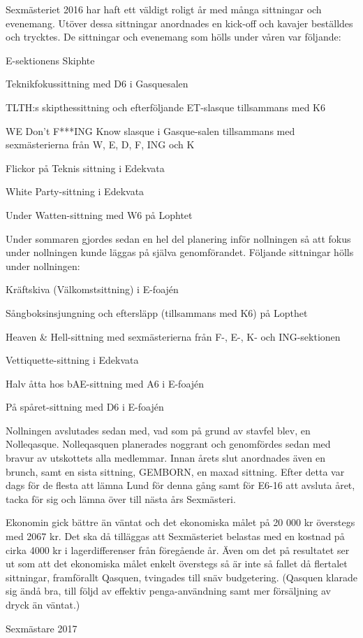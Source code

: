 \documentclass[../_main/handlingar.tex]{subfiles}
\begin{document}
Sexmästeriet 2016 har haft ett väldigt roligt år med många sittningar och evenemang. Utöver dessa sittningar anordnades en kick-off och kavajer beställdes och trycktes. De sittningar och evenemang som hölls under våren var följande:
\begin{dashlist}
  \item E-sektionens Skiphte
  \item Teknikfokussittning med D6 i Gasquesalen
  \item TLTH:s skipthessittning och efterföljande ET-slasque tillsammans med K6
  \item WE Don’t F***ING Know slasque i Gasque-salen tillsammans med sexmästerierna från W, E, D, F, ING och K
  \item Flickor på Teknis sittning i Edekvata
  \item White Party-sittning i Edekvata
  \item Under Watten-sittning med W6 på Lophtet
\end{dashlist}
Under sommaren gjordes sedan en hel del planering inför nollningen så att fokus under nollningen kunde läggas på själva genomförandet. Följande sittningar hölls under nollningen:
\begin{dashlist}
  \item Kräftskiva (Välkomstsittning) i E-foajén
  \item Sångboksinsjungning och eftersläpp (tillsammans med K6)  på Lopthet
  \item Heaven \& Hell-sittning med sexmästerierna från F-, E-, K- och ING-sektionen
  \item Vettiquette-sittning i Edekvata
  \item Halv åtta hos bAE-sittning med A6 i E-foajén
  \item På spåret-sittning med D6 i E-foajén
\end{dashlist}
Nollningen avslutades sedan med, vad som på grund av stavfel blev, en Nolleqasque. Nolleqasquen planerades noggrant och genomfördes sedan med bravur av utskottets alla medlemmar. Innan årets slut anordnades även en brunch, samt en sista sittning, GEMBORN, en maxad sittning. Efter detta var dags för de flesta att lämna Lund för denna gång samt för E6-16 att avsluta året, tacka för sig och lämna över till nästa års Sexmästeri.

Ekonomin gick bättre än väntat och det ekonomiska målet på 20 000 kr överstegs med 2067 kr. Det ska då tilläggas att Sexmästeriet belastas med en kostnad på cirka 4000 kr i lagerdifferenser från föregående år. Även om det på resultatet ser ut som att det ekonomiska målet enkelt överstegs så är inte så fallet då flertalet sittningar, framförallt Qasquen, tvingades till snäv budgetering. (Qasquen klarade sig ändå bra, till följd av effektiv penga-användning samt mer försäljning av dryck än väntat.)
\begin{signatures}{1}
    \mvh
    \signature{Linnea Sjödahl}{Sexmästare 2017}
\end{signatures}
\end{document}
